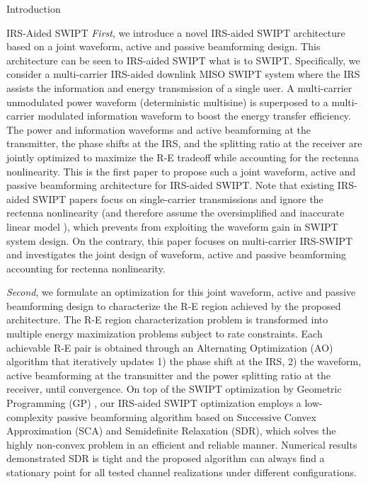 \documentclass[journal]{IEEEtran}
\begin{document}
\begin{section}{Introduction}
\begin{subsection}{IRS-Aided SWIPT}
			\textit{First}, we introduce a novel IRS-aided SWIPT architecture based on a joint waveform, active and passive beamforming design. This architecture can be seen to IRS-aided SWIPT what \cite{Clerckx2018b} is to SWIPT. Specifically, we consider a multi-carrier IRS-aided downlink MISO SWIPT system where the IRS assists the information and energy transmission of a single user. A multi-carrier unmodulated power waveform (deterministic multisine) is superposed to a multi-carrier modulated information waveform to boost the energy transfer efficiency. The power and information waveforms and active beamforming at the transmitter, the phase shifts at the IRS, and the splitting ratio at the receiver are jointly optimized to maximize the R-E tradeoff while accounting for the rectenna nonlinearity. This is the first paper to propose such a joint waveform, active and passive beamforming architecture for IRS-aided SWIPT. Note that existing IRS-aided SWIPT papers \cite{Wu2020b,Tang2019,Wu2020a,Pan2020} focus on single-carrier transmissions and ignore the rectenna nonlinearity (and therefore assume the oversimplified and inaccurate linear model \cite{Clerckx2019,Clerckx2016a}), which prevents from exploiting the waveform gain in SWIPT system design. On the contrary, this paper focuses on multi-carrier IRS-SWIPT and investigates the joint design of waveform, active and passive beamforming accounting for rectenna nonlinearity.

			\textit{Second}, we formulate an optimization for this joint waveform, active and passive beamforming design to characterize the R-E region achieved by the proposed architecture. The R-E region characterization problem is transformed into multiple energy maximization problems subject to rate constraints. Each achievable R-E pair is obtained through an Alternating Optimization (AO) algorithm that iteratively updates 1) the phase shift at the IRS, 2) the waveform, active beamforming at the transmitter and the power splitting ratio at the receiver, until convergence. On top of the SWIPT optimization by Geometric Programming (GP) \cite{Clerckx2018b}, our IRS-aided SWIPT optimization employs a low-complexity passive beamforming algorithm based on Successive Convex Approximation (SCA) and Semidefinite Relaxation (SDR), which solves the highly non-convex problem in an efficient and reliable manner. Numerical results demonstrated SDR is tight and the proposed algorithm can always find a stationary point for all tested channel realizations under different configurations.


\end{subsection}
\end{section}
\end{document}
